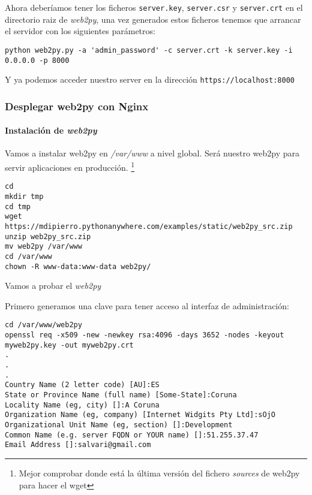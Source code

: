 \documentclass[12pt,spanish,]{article}
\let\oldparagraph\paragraph
\renewcommand{\paragraph}[1]{\oldparagraph{#1}\mbox{}}
\begin{document}
Ahora deberíamos tener los ficheros \texttt{server.key},
\texttt{server.csr} y \texttt{server.crt} en el directorio raiz de
\emph{web2py}, una vez generados estos ficheros tenemos que arrancar el
servidor con los siguientes parámetros:

\begin{verbatim}
python web2py.py -a 'admin_password' -c server.crt -k server.key -i 0.0.0.0 -p 8000
\end{verbatim}

Y ya podemos acceder nuestro server en la dirección
\texttt{https://localhost:8000}

\subsubsection{Desplegar web2py con
Nginx}\label{desplegar-web2py-con-nginx}

\paragraph{\texorpdfstring{Instalación de
\emph{web2py}}{Instalación de web2py}}\label{instalaciuxf3n-de-web2py-1}

Vamos a instalar web2py en \emph{/var/www} a nivel global. Será nuestro
web2py para servir aplicaciones en producción. \footnote{Mejor comprobar
  donde está la última versión del fichero \emph{sources} de web2py para
  hacer el wget}

\begin{verbatim}
cd
mkdir tmp
cd tmp
wget https://mdipierro.pythonanywhere.com/examples/static/web2py_src.zip
unzip web2py_src.zip
mv web2py /var/www
cd /var/www
chown -R www-data:www-data web2py/
\end{verbatim}

Vamos a probar el \emph{web2py}

Primero generamos una clave para tener acceso al interfaz de
administración:

\begin{verbatim}
cd /var/www/web2py
openssl req -x509 -new -newkey rsa:4096 -days 3652 -nodes -keyout myweb2py.key -out myweb2py.crt
.
.
.
Country Name (2 letter code) [AU]:ES
State or Province Name (full name) [Some-State]:Coruna
Locality Name (eg, city) []:A Coruna
Organization Name (eg, company) [Internet Widgits Pty Ltd]:sOjO
Organizational Unit Name (eg, section) []:Development
Common Name (e.g. server FQDN or YOUR name) []:51.255.37.47
Email Address []:salvari@gmail.com
\end{verbatim}
\end{document}
